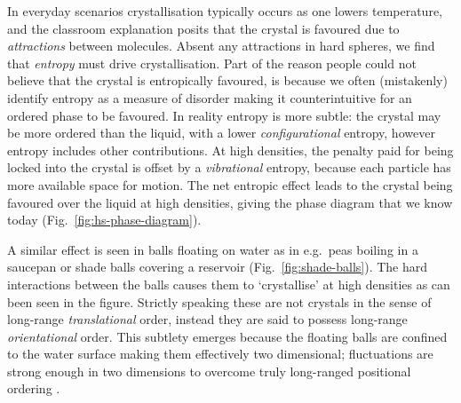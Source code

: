 \documentclass[11pt,twoside]{report}
\begin{document}
In everyday scenarios crystallisation typically occurs as one lowers temperature, and the classroom explanation posits that the crystal is favoured due to \emph{attractions} between molecules.
Absent any attractions in hard spheres, we find that \emph{entropy} must drive crystallisation.
Part of the reason people could not believe that the crystal is entropically favoured, is because we often (mistakenly) identify entropy as a measure of disorder making it counterintuitive for an ordered phase to be favoured.
In reality entropy is more subtle: the crystal may be more ordered than the liquid, with a lower \emph{configurational} entropy, however entropy includes other contributions.
At high densities, the penalty paid for being locked into the crystal is offset by a \emph{vibrational} entropy, because each particle has more available space for motion.
The net entropic effect leads to the crystal being favoured over the liquid at high densities, giving the phase diagram that we know today (Fig.\ \ref{fig:hs-phase-diagram}).

A similar effect is seen in balls floating on water as in e.g.\ peas boiling in a saucepan or shade balls covering a reservoir (Fig.\ \ref{fig:shade-balls}).
The hard interactions between the balls causes%
them to `crystallise' at high densities as can been seen in the figure.
Strictly speaking these are not crystals in the sense of long-range \emph{translational} order, instead they are said to possess long-range \emph{orientational} order.
This subtlety emerges because the floating balls are confined to the water surface making them effectively two dimensional; fluctuations are strong enough in two dimensions to overcome truly long-ranged positional ordering \cite{MerminPRL1966,MerminPR1968}.
\end{document}
